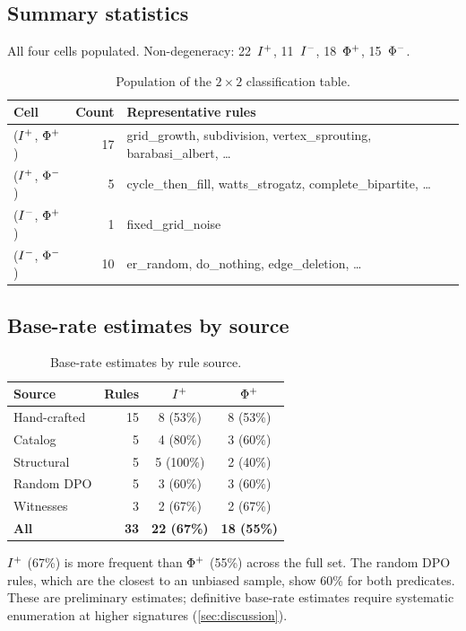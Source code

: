 \documentclass{../shared/primo}
\begin{document}
\subsection{Summary statistics}

All four cells populated. Non-degeneracy: 22~$I\textsuperscript{+}$, 11~$I\textsuperscript{$-$}$, 18~$\Phi\textsuperscript{+}$, 15~$\Phi\textsuperscript{$-$}$.

\begin{table}[ht]
\centering
\begin{tabular}{lrl}
\toprule
Cell & Count & Representative rules \\
\midrule
($I\textsuperscript{+}$, $\Phi\textsuperscript{+}$) & 17 & grid\_growth, subdivision, vertex\_sprouting, barabasi\_albert, \ldots \\
($I\textsuperscript{+}$, $\Phi\textsuperscript{$-$}$) & 5 & cycle\_then\_fill, watts\_strogatz, complete\_bipartite, \ldots \\
($I\textsuperscript{$-$}$, $\Phi\textsuperscript{+}$) & 1 & fixed\_grid\_noise \\
($I\textsuperscript{$-$}$, $\Phi\textsuperscript{$-$}$) & 10 & er\_random, do\_nothing, edge\_deletion, \ldots \\
\bottomrule
\end{tabular}
\caption{Population of the $2 \times 2$ classification table.}
\label{tab:cells}
\end{table}

\subsection{Base-rate estimates by source}

\begin{table}[ht]
\centering
\begin{tabular}{lrcc}
\toprule
Source & Rules & $I\textsuperscript{+}$ & $\Phi\textsuperscript{+}$ \\
\midrule
Hand-crafted & 15 & 8 (53\%) & 8 (53\%) \\
Catalog & 5 & 4 (80\%) & 3 (60\%) \\
Structural & 5 & 5 (100\%) & 2 (40\%) \\
Random DPO & 5 & 3 (60\%) & 3 (60\%) \\
Witnesses & 3 & 2 (67\%) & 2 (67\%) \\
\midrule
\textbf{All} & \textbf{33} & \textbf{22 (67\%)} & \textbf{18 (55\%)} \\
\bottomrule
\end{tabular}
\caption{Base-rate estimates by rule source.}
\label{tab:baserates}
\end{table}

$I\textsuperscript{+}$ (67\%) is more frequent than $\Phi\textsuperscript{+}$ (55\%) across the full set. The random DPO rules, which are the closest to an unbiased sample, show 60\% for both predicates. These are preliminary estimates; definitive base-rate estimates require systematic enumeration at higher signatures (\cref{sec:discussion}).
\end{document}
